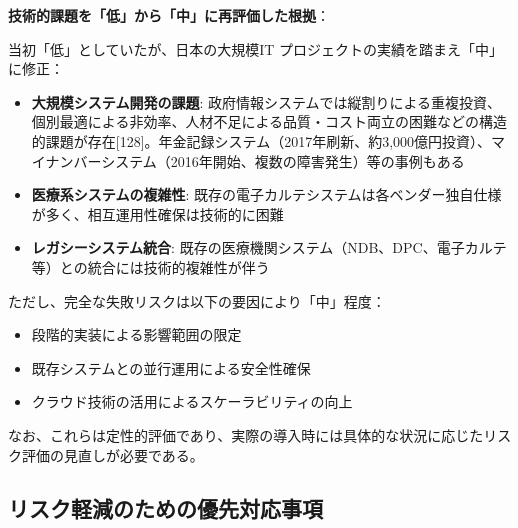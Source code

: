 \documentclass[
  a4paper,
  a4paper,
  11pt]{ltjsbook}
\providecommand{\tightlist}{%
  \setlength{\itemsep}{0pt}\setlength{\parskip}{0pt}}
\begin{document}
\begin{tcolorbox}
\textbf{技術的課題を「低」から「中」に再評価した根拠}：

当初「低」としていたが、日本の大規模IT
プロジェクトの実績を踏まえ「中」に修正：

\begin{itemize}
\tightlist
\item
  \textbf{大規模システム開発の課題}:
  政府情報システムでは縦割りによる重複投資、個別最適による非効率、人材不足による品質・コスト両立の困難などの構造的課題が存在{[}128{]}。年金記録システム（2017年刷新、約3,000億円投資）、マイナンバーシステム（2016年開始、複数の障害発生）等の事例もある
\item
  \textbf{医療系システムの複雑性}:
  既存の電子カルテシステムは各ベンダー独自仕様が多く、相互運用性確保は技術的に困難
\item
  \textbf{レガシーシステム統合}:
  既存の医療機関システム（NDB、DPC、電子カルテ等）との統合には技術的複雑性が伴う
\end{itemize}

ただし、完全な失敗リスクは以下の要因により「中」程度：

\begin{itemize}
\tightlist
\item
  段階的実装による影響範囲の限定
\item
  既存システムとの並行運用による安全性確保
\item
  クラウド技術の活用によるスケーラビリティの向上
\end{itemize}

なお、これらは定性的評価であり、実際の導入時には具体的な状況に応じたリスク評価の見直しが必要である。

\end{tcolorbox}

\subsection{リスク軽減のための優先対応事項}\label{ux30eaux30b9ux30afux8efdux6e1bux306eux305fux3081ux306eux512aux5148ux5bfeux5fdcux4e8bux9805}
\end{document}
